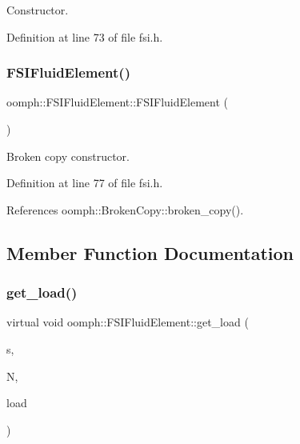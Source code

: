 Constructor. 



Definition at line 73 of file fsi.\+h.

\mbox{\label{classoomph_1_1FSIFluidElement_a28c2f33a00254914cb70cd10841ed8d0}} 
\subsubsection{\texorpdfstring{F\+S\+I\+Fluid\+Element()}{FSIFluidElement()}\hspace{0.1cm}{\footnotesize\ttfamily [2/2]}}
{\footnotesize\ttfamily oomph\+::\+F\+S\+I\+Fluid\+Element\+::\+F\+S\+I\+Fluid\+Element (\begin{DoxyParamCaption}\item[{const \hyperlink{classoomph_1_1FSIFluidElement}{F\+S\+I\+Fluid\+Element} \&}]{ }\end{DoxyParamCaption})\hspace{0.3cm}{\ttfamily [inline]}}



Broken copy constructor. 



Definition at line 77 of file fsi.\+h.



References oomph\+::\+Broken\+Copy\+::broken\+\_\+copy().



\subsection{Member Function Documentation}
\mbox{\label{classoomph_1_1FSIFluidElement_acf10e6a716b5e0f743579dfce32e9294}} 
\subsubsection{\texorpdfstring{get\+\_\+load()}{get\_load()}}
{\footnotesize\ttfamily virtual void oomph\+::\+F\+S\+I\+Fluid\+Element\+::get\+\_\+load (\begin{DoxyParamCaption}\item[{const \hyperlink{classoomph_1_1Vector}{Vector}$<$ double $>$ \&}]{s,  }\item[{const \hyperlink{classoomph_1_1Vector}{Vector}$<$ double $>$ \&}]{N,  }\item[{\hyperlink{classoomph_1_1Vector}{Vector}$<$ double $>$ \&}]{load }\end{DoxyParamCaption})\hspace{0.3cm}{\ttfamily [pure virtual]}}



